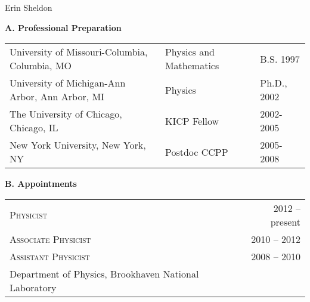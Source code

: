 \documentclass[10pt]{article}
\begin{document}
\begin{center}
{\huge \sc Erin Sheldon}\\
\end{center}


{\large \bf A. Professional Preparation}
\vspace{-0.5em}
\begin{table}[h]
\begin{tabular}{lll}
University of Missouri-Columbia, Columbia, MO & Physics and Mathematics & B.S. 1997\\
University of Michigan-Ann Arbor, Ann Arbor, MI &  Physics &  Ph.D., 2002\\
The University of Chicago, Chicago, IL & KICP Fellow & 2002-2005\\
New York University, New York, NY & Postdoc CCPP & 2005-2008\\
\end{tabular}
\end{table}

{\large \bf B. Appointments}
\vspace{-0.5em}
\begin{table}[h]
\begin{tabularx}{\textwidth}{lR}
\textsc{Physicist} & 2012 -- present\\
\textsc{Associate Physicist} & 2010 -- 2012\\
\textsc{Assistant Physicist} & 2008 -- 2010\\
Department of Physics, Brookhaven National Laboratory \\
\end{tabularx}
\end{table}
\end{document}

